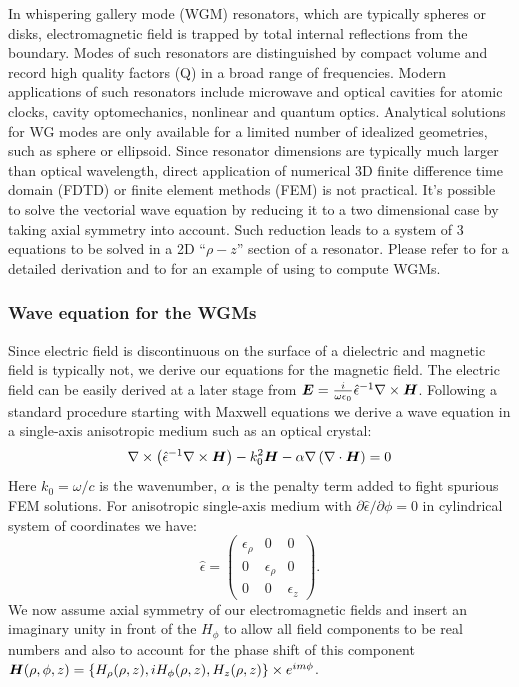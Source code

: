 \documentclass[a4paper,twoside,12pt]{book}
\def\vec#1{\mbox{\boldmath $#1$}}
\begin{document}
In whispering gallery mode (WGM) resonators, which are typically spheres or disks, electromagnetic field is trapped by total internal reflections from the boundary. Modes of such resonators are distinguished by compact volume and record high quality factors (Q) in a broad range of frequencies. Modern applications of such resonators include microwave and optical cavities for atomic clocks, cavity optomechanics, nonlinear and quantum optics. Analytical solutions for WG modes are only available for a limited number of idealized geometries, such as sphere or ellipsoid. Since  resonator dimensions are typically much larger than optical wavelength, direct application of numerical 3D finite difference time domain (FDTD) or finite element methods (FEM) is not practical. It's possible to solve the vectorial wave equation by reducing it to a two dimensional case by taking axial symmetry into account. Such reduction leads to a system of 3 equations to be solved in a 2D ``$\rho-z$'' section of a resonator. Please refer to \cite{Oxborrow} for a detailed derivation and to \cite{Grudinin} for an example of using \freefempp to compute WGMs.

\subsubsection{Wave equation for the WGMs}
Since electric field is discontinuous on the surface of a dielectric and magnetic field is typically not, we derive our equations for the magnetic field. The electric field can be easily derived at a later stage from $\vec{E}=\frac{i}{\omega\epsilon_0}\hat{\epsilon}^{-1}\nabla\times\vec{H}$. Following a standard procedure starting with Maxwell equations we derive a wave equation in a single-axis anisotropic medium such as an optical crystal:
\begin{equation}\label{eq:wave}
\nabla\times\left(\hat{\epsilon}^{-1}\nabla\times\vec{H}\right)-k_0^2\vec{H}-\alpha\nabla\left(\nabla\cdot\vec{H}\right)=0 
\end{equation}
Here $k_0=\omega/c$ is the wavenumber, $\alpha$ is the penalty term added to fight spurious FEM solutions.  For anisotropic single-axis medium with $\partial\hat{\epsilon}/\partial\phi=0$ in cylindrical system of coordinates we have:
\begin{equation}
\hat{\epsilon}=\begin{pmatrix} \epsilon_{\rho} & 0 & 0 \\ 0 & \epsilon_{\rho} & 0 \\ 0 & 0 & \epsilon_z \end{pmatrix}. \nonumber
\end{equation}
We now assume axial symmetry of our electromagnetic fields and insert an imaginary unity in front of the $H_{\phi}$ to allow all field components to be real numbers and also to account for the phase shift of this component $\vec{H}(\rho,\phi,z)=\left\{H_{\rho}(\rho,z),iH_{\phi}(\rho,z),H_z(\rho,z)\right\}\times e^{im\phi}$. 
\end{document}
